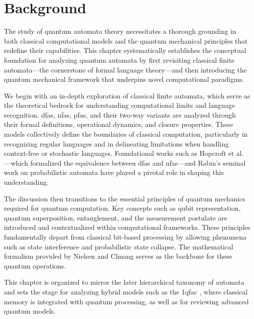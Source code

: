 \chapter{Background}  
\label{chap:background}

The study of quantum automata theory necessitates a thorough grounding in both classical computational models and the quantum mechanical principles that redefine their capabilities. This chapter systematically establishes the conceptual foundation for analyzing quantum automata by first revisiting classical finite automata—the cornerstone of formal language theory—and then introducing the quantum mechanical framework that underpins novel computational paradigms.

We begin with an in-depth exploration of classical finite automata, which serve as the theoretical bedrock for understanding computational limits and language recognition. \glspl{dfa}, \glspl{nfa}, \glspl{pfa}, and their two-way variants are analyzed through their formal definitions, operational dynamics, and closure properties. These models collectively define the boundaries of classical computation, particularly in recognizing regular languages and in delineating limitations when handling context-free or stochastic languages. Foundational works such as Hopcroft et al. \cite{hopcroft2006introduction}—which formalized the equivalence between \glspl{dfa} and \glspl{nfa}—and Rabin's seminal work on probabilistic automata \cite{rabin1963probabilistic} have played a pivotal role in shaping this understanding.

The discussion then transitions to the essential principles of quantum mechanics required for quantum computation. Key concepts such as qubit representation, quantum superposition, entanglement, and the measurement postulate are introduced and contextualized within computational frameworks. These principles fundamentally depart from classical bit-based processing by allowing phenomena such as state interference and probabilistic state collapse. The mathematical formalism provided by Nielsen and Chuang \cite{nielsen2010quantum} serves as the backbone for these quantum operations.

This chapter is organized to mirror the later hierarchical taxonomy of automata and sets the stage for analyzing hybrid models such as the \gls{1qfac} \cite{zheng2012one}, where classical memory is integrated with quantum processing, as well as for reviewing advanced quantum models.



